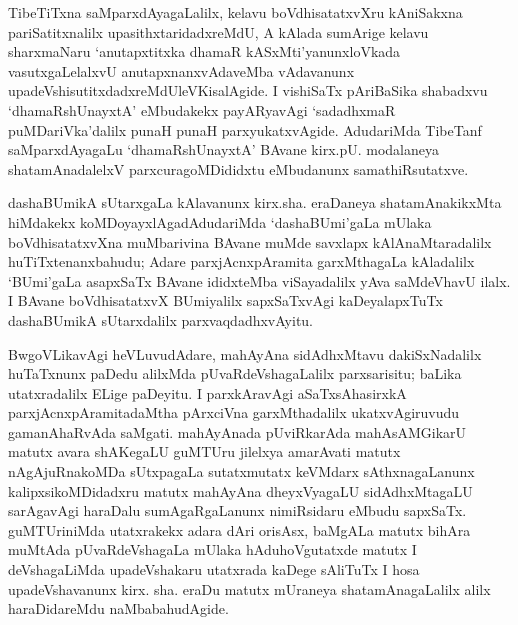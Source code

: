 TibeTiTxna saMparxdAyagaLalilx, kelavu boVdhisatatxvXru kAniSakxna pariSatitxnalilx upa\-sithxta\-ridadxreMdU, A kAlada sumArige kelavu sharxmaNaru `anutapxtitxka dhamaR kASxMti'yanunx\break loVkada vasutxgaLelalxvU anutapxnanxvAdaveMba vAdavanunx upadeVshisutitxdadxreMdU\break leVKisalAgide. I vishiSaTx pAriBaSika shabadxvu `dhamaRshUnayxtA' eMbudakekx payARya\-vAgi `sadadhxmaR puMDariVka'dalilx punaH punaH parxyukatxvAgide. AdudariMda TibeTanf saMparxdAyagaLu `dhamaRshUnayxtA' BAvane kirx.pU. modalaneya shatamAnadalelxV parxcuragoMDididxtu eMbudanunx samathiRsutatxve.

dashaBUmikA sUtarxgaLa kAlavanunx kirx.sha. eraDaneya shatamAnakikxMta hiMdakekx koMDoyayxlAgadAdudariMda `dashaBUmi'gaLa mUlaka boVdhisatatxvXna muMbarivina BAvane muMde savxlapx kAlAnaMtaradalilx huTiTxtenanxbahudu; Adare parxjAcnxpAramita garxMthagaLa kAladalilx `BUmi'gaLa asapxSaTx BAvane ididxteMba viSayadalilx yAva saMdeVhavU ilalx. I BAvane boVdhisatatxvX BUmiyalilx sapxSaTxvAgi kaDeyalapxTuTx dashaBUmikA sUtarxdalilx parxvaqdadhxvAyitu.

BwgoVLikavAgi heVLuvudAdare, mahAyAna sidAdhxMtavu dakiSxNadalilx huTaTxnunx paDedu alilxMda pUvaRdeVshagaLalilx parxsarisitu; baLika utatxradalilx ELige paDeyitu. I parxkAravAgi aSaTxsAhasirxkA parxjAcnxpAramitadaMtha pArxciVna garxMthadalilx ukatxvAgi\-ruvudu gamanAhaRvAda saMgati. mahAyAnada pUviRkarAda mahAsAMGikarU matutx avara shAKegaLU guMTUru jilelxya amarAvati matutx nAgAjuRnakoMDa sUtxpagaLa sutatxmutatx keVMdarx sAthxnagaLanunx kalipxsikoMDidadxru matutx mahAyAna dheyxVyagaLU sidAdhxMtagaLU sarAgavAgi haraDalu sumAgaRgaLanunx nimiRsidaru eMbudu sapxSaTx. guMTUriniMda utatxrakekx adara dAri orisAsx, baMgALa matutx bihAra muMtAda pUvaRdeVshagaLa mUlaka hAduhoVgutatxde matutx I deVshagaLiMda upadeVshakaru utatxrada kaDege sAliTuTx I hosa upadeVshavanunx kirx. sha. eraDu matutx mUraneya shatamAnagaLalilx alilx haraDidareMdu naMbabahudAgide.

\theendnotes
